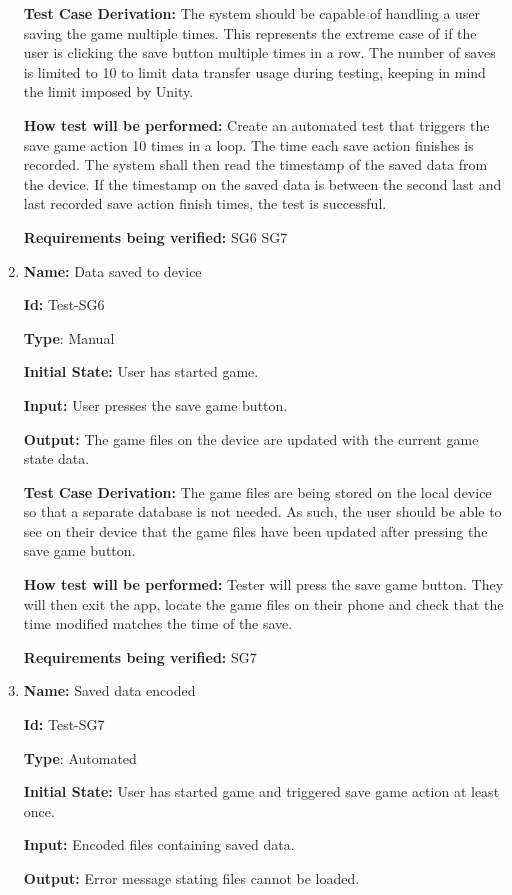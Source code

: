 \documentclass[12pt, titlepage]{article}
\begin{document}
\begin{enumerate}
\textbf{Test Case Derivation:}
The system should be capable of handling a user saving the game multiple times. This represents the extreme case of if the user is clicking the save button multiple times in a row. The number of saves is limited to 10 to limit data transfer usage during testing, keeping in mind the limit imposed by Unity.

\textbf{How test will be performed:}
Create an automated test that triggers the save game action 10 times in a loop. The time each save action finishes is recorded. The system shall then read the timestamp of the saved data from the device. If the timestamp on the saved data is between the second last and last recorded save action finish times, the test is successful. 

\textbf{Requirements being verified: } SG6 SG7

\item{\textbf{Name:} Data saved to device}

\textbf{Id:} Test-SG6

\textbf{Type}: Manual

\textbf{Initial State:} User has started game.

\textbf{Input:} User presses the save game button.

\textbf{Output:} The game files on the device are updated with the current game state data.

\textbf{Test Case Derivation:}
The game files are being stored on the local device so that a separate database is not needed. As such, the user should be able to see on their device that the game files have been updated after pressing the save game button.

\textbf{How test will be performed:}
Tester will press the save game button. They will then exit the app, locate the game files on their phone and check that the time modified matches the time of the save. 

\textbf{Requirements being verified: } SG7

\item{\textbf{Name:} Saved data encoded}

\textbf{Id:} Test-SG7

\textbf{Type}: Automated

\textbf{Initial State:} User has started game and triggered save game action at least once.

\textbf{Input:} Encoded files containing saved data.

\textbf{Output:} Error message stating files cannot be loaded.


\end{enumerate}
\end{document}

